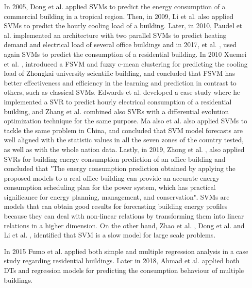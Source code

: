 In 2005, Dong et al. \cite{svm2} applied \ac{SVM}s to predict the energy consumption of a commercial building in a tropical region. Then, in 2009, Li et al. \cite{svmr1} also applied \ac{SVM}s to predict the hourly cooling load of a building. Later, in 2010, Paudel et al. \cite{svm3} implemented an architecture with two parallel \ac{SVM}s to predict heating demand and electrical load of several office buildings and in 2017, et al. \cite{svmr7}, used again \ac{SVM}s to predict the consumption of a residential building. In 2010 Xuemei et al. \cite{svmr2}, introduced a \ac{FSVM} and fuzzy c-mean clustering for predicting the cooling load of Zhongkai university scientific building, and concluded that \ac{FSVM} has better effectiveness and efficiency in the learning and prediction in contrast to others, such as classical \ac{SVM}s. Edwards et al. \cite{svmr3} developed a case study where he implemented a \ac{SVR} to predict hourly electrical consumption of a residential building, and Zhang et al. \cite{svmr4} combined also \ac{SVR}s with a differential evolution optimization technique for the same purpose. Ma also et al. \cite{svmr5} also applied \ac{SVM}s to tackle the same problem in China, and concluded that \ac{SVM} model forecasts are well aligned with the statistic values in all the seven zones of the country tested, as well as with the whole nation data. Lastly, in 2019, Zhong et al. \cite{svmr6}, also applied \ac{SVR}s for building energy consumption prediction of an office building and concluded that "The energy consumption prediction obtained by applying the proposed models to a real office building can provide an accurate energy consumption scheduling plan for the power system, which has practical significance for energy planning, management, and conservation". \ac{SVM}s are models that can obtain good results for forecasting building energy profiles because they can deal with non-linear relations by transforming them into linear relations in a higher dimension. On the other hand, Zhao et al. \cite{svm3}, Dong et al. \cite{svm2} and Li et al. \cite{svm5}, identified that \ac{SVM} is a slow model for large scale problems.
 
In 2015 Fumo et al. \cite{regression0} applied both simple and multiple regression analysis in a case study regarding residential buildings. Later in 2018, Ahmad et al. \cite{dt0} applied both DTs and regression models for predicting the consumption behaviour of multiple buildings.

